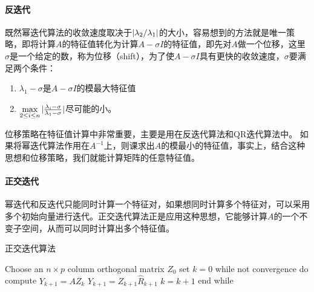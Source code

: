 \documentclass[UTF8]{article}
\begin{document}
\begin{flushleft}
\paragraph{反迭代}
既然幂迭代算法的收敛速度取决于$\arrowvert \lambda_2/\lambda_1 \arrowvert$的大小，容易想到的方法就是\textcolor[rgb]{0.00,0.07,1.00}{唯一策略}，即将计算$A$的特征值转化为计算$A-\sigma I$的特征值，即先对$A$做一个位移，这里$\sigma$是一个给定的数，称为\textcolor[rgb]{0.00,0.07,1.00}{位移}（shift），为了使$A-\sigma I$具有更快的收敛速度，$\sigma$要满足两个条件：
\begin{enumerate}[(1)]
  \item $\lambda_1-\sigma$是$A-\sigma I$的模最大特征值
  \item $\max \limits_{2 \leq i \leq n}\arrowvert \frac{\lambda_i-\sigma}{\lambda_1-\sigma} \arrowvert$尽可能的小。
\end{enumerate}
位移策略在特征值计算中非常重要，主要是用在反迭代算法和QR迭代算法中。
\smallskip
如果将幂迭代算法作用在$A^{-1}$上，则课求出$A$的模最小的特征值，事实上，结合这种思想和位移策略，我们就能计算矩阵的任意特征值。

\paragraph{正交迭代}
幂迭代和反迭代只能同时计算一个特征对，如果想同时计算多个特征对，可以采用多个初始向量进行迭代。正交迭代算法正是应用这种思想，它能够计算$A$的一个不变子空间，从而可以同时计算出多个特征值。

\begin{algorithm}[H]
\caption{正交迭代算法}
\begin{algorithmic}[1]
  \State Choose an $n \times p$ column orthogonal matrix $Z_0$
  \State set $k=0$
  \State while not convergence do
  \State \qquad compute $Y_{k+1}=AZ_k$
  \State \qquad $Y_{k+1}=Z_{k+1}\hat{R}_{k+1}$    %
  \State \qquad $k=k+1$
  \State end while
\end{algorithmic}
\end{algorithm}


\end{flushleft}
\end{document}
